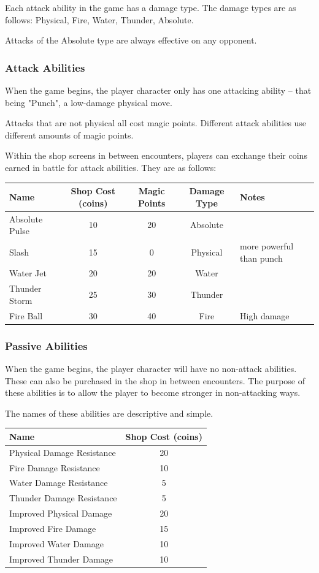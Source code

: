Each attack ability in the game has a damage type. The damage types are as follows: Physical, Fire, Water, Thunder, Absolute.

Attacks of the Absolute type are always effective on any opponent.

\subsubsection{Attack Abilities}

When the game begins, the player character only has one attacking ability – that being "Punch", a low-damage physical move.

Attacks that are not physical all cost magic points. Different attack abilities use different amounts of magic points.

Within the shop screens in between encounters, players can exchange their coins earned in battle for attack abilities. They are as follows:

\begin{center}
\begin{tabular}{|l|c|c|c|l|}
\hline
Name & Shop Cost (coins) & Magic Points & Damage Type & Notes \\
\hline
Absolute Pulse & 10 & 20 & Absolute & \\
Slash & 15 & 0 & Physical & more powerful than punch \\
Water Jet & 20 & 20 & Water & \\
Thunder Storm & 25 & 30 & Thunder & \\
Fire Ball & 30 & 40 & Fire & High damage \\
\hline
\end{tabular}
\end{center}

\subsubsection{Passive Abilities}

When the game begins, the player character will have no non-attack abilities. These can also be purchased in the shop in between encounters. The purpose of these abilities is to allow the player to become stronger in non-attacking ways.

The names of these abilities are descriptive and simple.

\begin{center}
\begin{tabular}{|l|c|}
\hline
Name & Shop Cost (coins) \\
\hline
Physical Damage Resistance & 20 \\
Fire Damage Resistance & 10 \\
Water Damage Resistance & 5 \\
Thunder Damage Resistance & 5 \\
Improved Physical Damage & 20 \\
Improved Fire Damage & 15 \\
Improved Water Damage & 10 \\
Improved Thunder Damage & 10 \\
\hline
\end{tabular}
\end{center}

